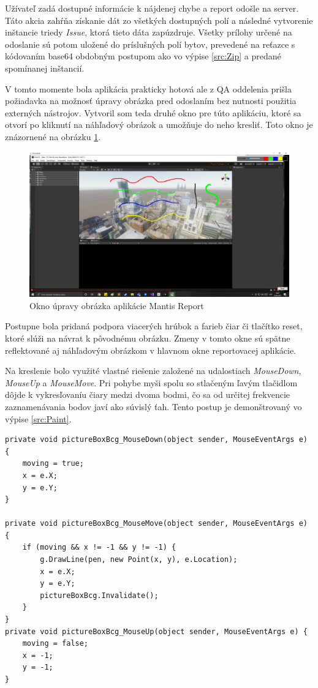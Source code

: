 \documentclass[slovak, bachelorpractice]{diploma}
\begin{document}
Užívateľ zadá dostupné informácie k nájdenej chybe a report odošle na server. Táto akcia zahŕňa získanie dát zo všetkých dostupných polí a následné vytvorenie inštancie triedy \textit{Issue}, ktorá tieto dáta zapúzdruje. Všetky prílohy určené na odoslanie sú potom uložené do príslušných polí bytov, prevedené na reťazce s kódovaním base64 obdobným postupom ako vo výpise \ref{src:Zip} a predané spomínanej inštancií.

V tomto momente bola aplikácia prakticky hotová ale z QA oddelenia prišla požiadavka na možnosť úpravy obrázka pred odoslaním bez nutnosti použitia externých nástrojov. Vytvoril som teda druhé okno pre túto aplikáciu, ktoré sa otvorí po kliknutí na náhľadový obrázok a umožňuje do neho kresliť. Toto okno je znázornené na obrázku \ref{pic:Paint}. 

\begin{figure}[!htbp]
	\centering
	\includegraphics[width=1\textwidth]{Pictures/pictureEditBox.png}
	\caption{Okno úpravy obrázka aplikácie Mantis Report}
	\label{pic:Paint}
\end{figure}

Postupne bola pridaná podpora viacerých hrúbok a farieb čiar či tlačítko reset, ktoré slúži na návrat k pôvodnému obrázku. Zmeny v tomto okne sú spätne reflektované aj náhľadovým obrázkom v hlavnom okne reportovacej aplikácie. 

Na kreslenie bolo využité vlastné riešenie založené na udalostiach \textit{MouseDown}, \textit{MouseUp} a \textit{MouseMove}. Pri pohybe myši spolu so stlačeným ľavým tlačidlom dôjde k vykresľovaníu čiary medzi dvoma bodmi, čo sa od určitej frekvencie zaznamenávania bodov javí ako súvislý ťah. Tento postup je demonštrovaný vo výpise \ref{src:Paint}.
\vspace{10pt}
\begin{lstlisting}[label=src:Paint,caption={Implementácia kreslenia v prostredí Windows Forms}]
private void pictureBoxBcg_MouseDown(object sender, MouseEventArgs e) {
    moving = true;
    x = e.X;
    y = e.Y;
}

private void pictureBoxBcg_MouseMove(object sender, MouseEventArgs e) {
    if (moving && x != -1 && y != -1) {
        g.DrawLine(pen, new Point(x, y), e.Location);
        x = e.X;
        y = e.Y;
        pictureBoxBcg.Invalidate();
    }
}
private void pictureBoxBcg_MouseUp(object sender, MouseEventArgs e) {
    moving = false;
    x = -1;
    y = -1;
}
\end{lstlisting}
\end{document}
